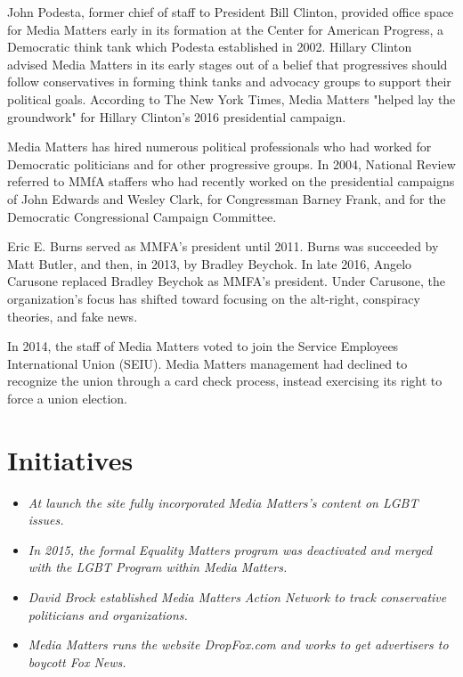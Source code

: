 John Podesta, former chief of staff to President Bill Clinton, provided
office space for Media Matters early in its formation at the Center for
American Progress, a Democratic think tank which Podesta established in
2002. Hillary Clinton advised Media Matters in its early stages out of a
belief that progressives should follow conservatives in forming think
tanks and advocacy groups to support their political goals. According to
The New York Times, Media Matters "helped lay the groundwork" for
Hillary Clinton's 2016 presidential campaign.

Media Matters has hired numerous political professionals who had worked
for Democratic politicians and for other progressive groups. In 2004,
National Review referred to MMfA staffers who had recently worked on the
presidential campaigns of John Edwards and Wesley Clark, for Congressman
Barney Frank, and for the Democratic Congressional Campaign Committee.

Eric E. Burns served as MMFA's president until 2011. Burns was succeeded
by Matt Butler, and then, in 2013, by Bradley Beychok. In late 2016,
Angelo Carusone replaced Bradley Beychok as MMFA's president. Under
Carusone, the organization's focus has shifted toward focusing on the
alt-right, conspiracy theories, and fake news.

In 2014, the staff of Media Matters voted to join the Service Employees
International Union (SEIU). Media Matters management had declined to
recognize the union through a card check process, instead exercising its
right to force a union election.

\section{Initiatives}\label{initiatives}

\begin{itemize}
\item
  \emph{At launch the site fully incorporated Media Matters's content on
  LGBT issues.}
\item
  \emph{In 2015, the formal Equality Matters program was deactivated and
  merged with the LGBT Program within Media Matters.}
\item
  \emph{David Brock established Media Matters Action Network to track
  conservative politicians and organizations.}
\item
  \emph{Media Matters runs the website DropFox.com and works to get
  advertisers to boycott Fox News.}
\end{itemize}

